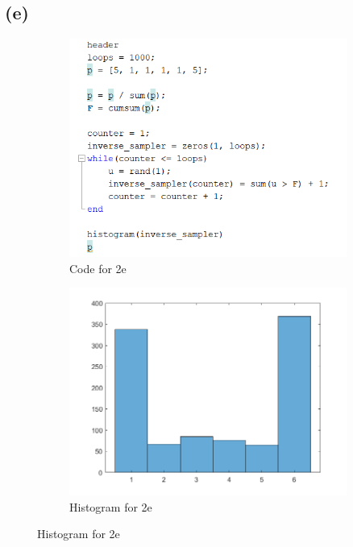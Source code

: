 \documentclass{article}
\begin{document}
\subsection{(e)}
\begin{figure}[H]
    \begin{subfigure}[h]{0.45\linewidth}
        \includegraphics[width=\linewidth]{imgs/q2e_code.png}
        \caption{Code for 2e}
    \end{subfigure}
    \hfill
    \begin{subfigure}[h]{0.45\linewidth}
        \includegraphics[width=\linewidth]{imgs/q2e_histogram.png}
        \caption{Histogram for 2e}
    \end{subfigure}
\end{figure}
\end{document}
